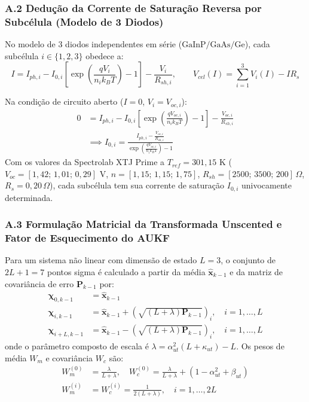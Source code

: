 \subsubsection*{A.2 Dedução da Corrente de Saturação Reversa por Subcélula (Modelo de 3 Diodos)}

No modelo de 3 diodos independentes em série ($\text{GaInP}/\text{GaAs}/\text{Ge}$), cada subcélula $i \in \{1, 2, 3\}$ obedece a:
\begin{equation}
    I = I_{ph,i} - I_{0,i} \left[ \exp\left( \frac{q V_i}{n_i k_B T} \right) - 1 \right] - \frac{V_i}{R_{sh,i}}, \qquad V_{cel}(I) = \sum_{i=1}^{3} V_i(I) - I R_s
\end{equation}

Na condição de circuito aberto ($I = 0$, $V_i = V_{oc,i}$):
\begin{align}
    0 &= I_{ph,i} - I_{0,i} \left[ \exp\left( \frac{q V_{oc,i}}{n_i k_B T} \right) - 1 \right] - \frac{V_{oc,i}}{R_{sh,i}} \nonumber \\
    &\implies I_{0,i} = \frac{I_{ph,i} - \frac{V_{oc,i}}{R_{sh,i}}}{\exp\left( \frac{q V_{oc,i}}{n_i k_B T} \right) - 1}
\end{align}
Com os valores da Spectrolab XTJ Prime a $T_{ref} = 301{,}15\text{ K}$ ($V_{oc} = [1{,}42;\, 1{,}01;\, 0{,}29]\text{ V}$, $n = [1{,}15;\, 1{,}15;\, 1{,}75]$, $R_{sh} = [2500;\, 3500;\, 200]\,\Omega$, $R_s = 0{,}20\,\Omega$), cada subcélula tem sua corrente de saturação $I_{0,i}$ univocamente determinada.

\subsubsection*{A.3 Formulação Matricial da Transformada Unscented e Fator de Esquecimento do AUKF}
\label{apendice:aukf_deducao}

Para um sistema não linear com dimensão de estado $L = 3$, o conjunto de $2L+1 = 7$ pontos sigma é calculado a partir da média $\hat{\mathbf{x}}_{k-1}$ e da matriz de covariância de erro $\mathbf{P}_{k-1}$ por:
\begin{align}
    \boldsymbol{\chi}_{0, k-1} &= \hat{\mathbf{x}}_{k-1} \\
    \boldsymbol{\chi}_{i, k-1} &= \hat{\mathbf{x}}_{k-1} + \left( \sqrt{(L + \lambda) \mathbf{P}_{k-1}} \right)_i, \quad i = 1, \dots, L \\
    \boldsymbol{\chi}_{i+L, k-1} &= \hat{\mathbf{x}}_{k-1} - \left( \sqrt{(L + \lambda) \mathbf{P}_{k-1}} \right)_i, \quad i = 1, \dots, L
\end{align}
onde o parâmetro composto de escala é $\lambda = \alpha_{ut}^2 (L + \kappa_{ut}) - L$. Os pesos de média $W_m$ e covariância $W_c$ são:
\begin{align}
    W_m^{(0)} &= \frac{\lambda}{L + \lambda}, \quad W_c^{(0)} = \frac{\lambda}{L + \lambda} + (1 - \alpha_{ut}^2 + \beta_{ut}) \\
    W_m^{(i)} &= W_c^{(i)} = \frac{1}{2(L + \lambda)}, \quad i = 1, \dots, 2L
\end{align}

